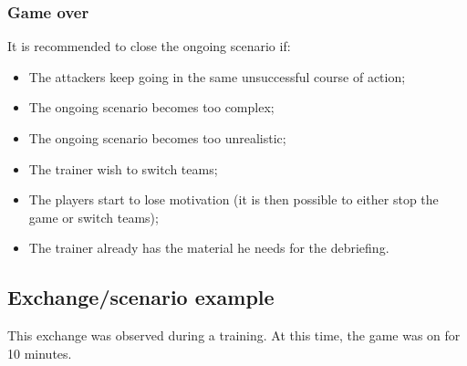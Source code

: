 \documentclass[11pt]{article} %
\begin{document}
\subsubsection{Game over}
It is recommended to close the ongoing scenario if: 
\begin{itemize}
\item The attackers keep going in the same unsuccessful course of action; 
\item The ongoing scenario becomes too complex;
\item The ongoing scenario becomes too unrealistic;
\item The trainer wish to switch teams;
\item The players start to lose motivation
(it is then possible to either stop the game or switch teams);
\item The trainer already has the material he needs for the debriefing.
\end{itemize}

\subsection{Exchange/scenario example}


This exchange was observed during a training. At this time, the game was on for 
10 minutes.
\end{document}
